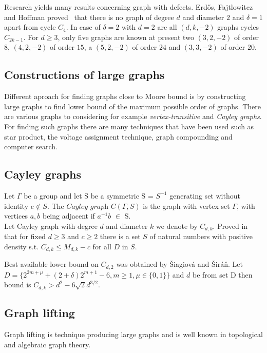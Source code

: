 \documentclass[a4paper,11pt,twoside]{report}%
\begin{document}
Research yields many results concerning graph with defects. Erdős, Fajtlowitcz and Hoffman proved~\cite{Erdos-Fajtlowicz-Hoffman} that there is no graph of degree $d$ and diameter $2$ and $\delta = 1$ apart from cycle $C_{4}$.  
In case of  $\delta = 2$ with $d = 2$ are all $(d,k,-2)$ graphs cycles $C_{2k-1}$. For $d \geq 3$, only five graphs are known at present two $(3,2,-2)$ of order $8$, $(4,2,-2)$ of order $15$, a $(5,2,-2)$ of order $24$ and $(3,3,-2)$ of order $20$.

\subsection{Constructions of large graphs}
Different aproach for finding graphs close to Moore bound is by constructing large graphs to find lower bound of the maximum possible order of graphs. There are various graphs to considering for example \textit{vertex-transitive} and \textit{Cayley graphs}. For finding such graphs there are many techniques that have been used such as star product, the voltage assignment technique, graph compounding and computer search. \\

\subsection{Cayley graphs}
Let $\Gamma$ be a group and let S be a symmetric S = $S^{-1}$ generating set without identity $e\not\in S$. The $\textit{Cayley graph}$ $C(\Gamma,S)$ is the graph with vertex set $\Gamma$, with vertices $a,b$ being adjacent if $a^{-1}b$ $\in$ S. \\

Let Cayley graph with degree $d$ and diameter $k$ we denote by $C_{d,k}$. Proved in ~\cite{Jacay-Macaj-Siran} that for fixed $d \geq 3$ and $c \geq 2$ there is a set $S$ of natural numbers with positive density s.t. $C_{d,k} \leq M_{d,k}-c$ for all $D$ in $S$. 
 
Best available lower bound on $C_{d,2}$ was obtained by Šiagiová and Širáň. Let $D = \{ 2^{2m+\mu}+(2+\delta)2^{m+1}-6,m \geq 1, \mu \in \{0,1\} \}$ and $d$ be from set D then bound is $C_{d,k} > d^{2} - 6\sqrt{2}d^{3/2}$.

\subsection{Graph lifting}
Graph lifting is technique producing large graphs and is well known in topological and algebraic graph theory.~\cite{Gross-Tucker} 
\end{document}
